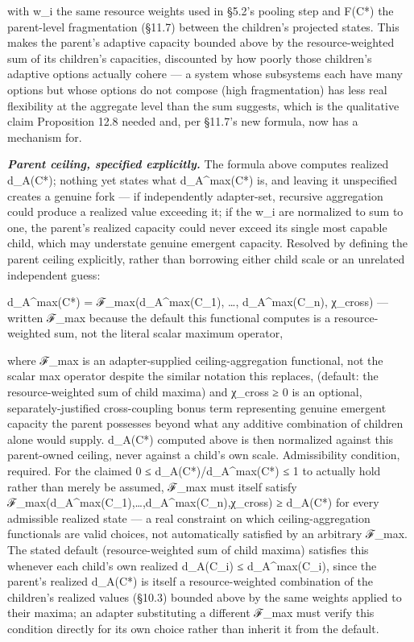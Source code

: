 \documentclass[
]{article}
\begin{document}
with w\_i the same resource weights used in §5.2's pooling step and
F(C*) the parent-level fragmentation (§11.7) between the children's
projected states. This makes the parent's adaptive capacity bounded
above by the resource-weighted sum of its children's capacities,
discounted by how poorly those children's adaptive options actually
cohere --- a system whose subsystems each have many options but whose
options do not compose (high fragmentation) has less real flexibility at
the aggregate level than the sum suggests, which is the qualitative
claim Proposition 12.8 needed and, per §11.7's new formula, now has a
mechanism for.

\emph{\textbf{Parent ceiling, specified explicitly.}} The formula above
computes realized d\_A(C*); nothing yet states what d\_A\^{}max(C*) is,
and leaving it unspecified creates a genuine fork --- if independently
adapter-set, recursive aggregation could produce a realized value
exceeding it; if the w\_i are normalized to sum to one, the parent's
realized capacity could never exceed its single most capable child,
which may understate genuine emergent capacity. Resolved by defining the
parent ceiling explicitly, rather than borrowing either child scale or
an unrelated independent guess:

d\_A\^{}max(C*) = ℱ\_max(d\_A\^{}max(C\_1), \ldots, d\_A\^{}max(C\_n),
χ\_cross) --- written ℱ\_max because the default this functional
computes is a resource-weighted sum, not the literal scalar maximum
operator,

where ℱ\_max is an adapter-supplied ceiling-aggregation functional, not
the scalar max operator despite the similar notation this replaces,
(default: the resource-weighted sum of child maxima) and χ\_cross ≥ 0 is
an optional, separately-justified cross-coupling bonus term representing
genuine emergent capacity the parent possesses beyond what any additive
combination of children alone would supply. d\_A(C*) computed above is
then normalized against this parent-owned ceiling, never against a
child's own scale. Admissibility condition, required. For the claimed 0
≤ d\_A(C*)/d\_A\^{}max(C*) ≤ 1 to actually hold rather than merely be
assumed, ℱ\_max must itself satisfy
ℱ\_max(d\_A\^{}max(C\_1),\ldots,d\_A\^{}max(C\_n),χ\_cross) ≥ d\_A(C*)
for every admissible realized state --- a real constraint on which
ceiling-aggregation functionals are valid choices, not automatically
satisfied by an arbitrary ℱ\_max. The stated default (resource-weighted
sum of child maxima) satisfies this whenever each child's own realized
d\_A(C\_i) ≤ d\_A\^{}max(C\_i), since the parent's realized d\_A(C*) is
itself a resource-weighted combination of the children's realized values
(§10.3) bounded above by the same weights applied to their maxima; an
adapter substituting a different ℱ\_max must verify this condition
directly for its own choice rather than inherit it from the default.
\end{document}
